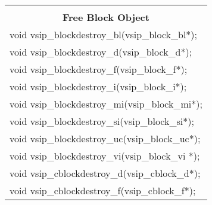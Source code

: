 {{\begin{tabular}[H]{l}
\hline\hline\\
\multicolumn{1}{c}{\rmfamily \bfseries Free Block Object\vspace{.1cm}}\\\hline
void vsip\_blockdestroy\_bl(vsip\_block\_bl*);\\
void vsip\_blockdestroy\_d(vsip\_block\_d*);\\
void vsip\_blockdestroy\_f(vsip\_block\_f*);\\
void vsip\_blockdestroy\_i(vsip\_block\_i*);\\
void vsip\_blockdestroy\_mi(vsip\_block\_mi*);\\
void vsip\_blockdestroy\_si(vsip\_block\_si*);\\
void vsip\_blockdestroy\_uc(vsip\_block\_uc*);\\
void vsip\_blockdestroy\_vi(vsip\_block\_vi *);\\
void vsip\_cblockdestroy\_d(vsip\_cblock\_d*);\\
void vsip\_cblockdestroy\_f(vsip\_cblock\_f*);\\
\end{tabular}
}}
\\\pyjvsiph

